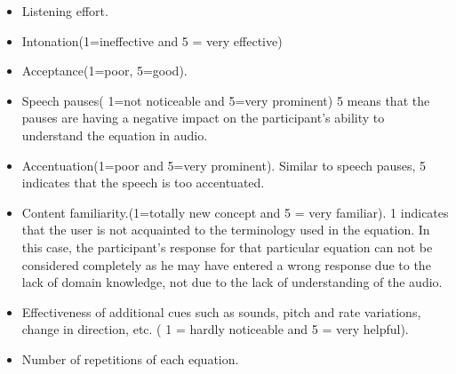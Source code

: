 \documentclass{article}
\begin{document}
\begin{itemize} 

 \item Listening effort.
 \item   Intonation(1=ineffective and 5 = very effective)
 \item   Acceptance(1=poor, 5=good).
 \item   Speech pauses( 1=not noticeable and 5=very prominent)
5 means that the pauses are having a negative impact on the participant’s ability to understand the equation in audio.
 \item   Accentuation(1=poor and 5=very prominent). \cite{hinterleitner2011evaluation}
Similar to speech pauses, 5 indicates that the speech is too accentuated.
 \item   Content familiarity.(1=totally new concept and 5 = very familiar).
1 indicates that the user is not acquainted to the terminology used in the equation. In this case, the participant’s response for that particular equation can not be considered completely as he may have entered a wrong response due to the lack of domain knowledge, not due to the lack of understanding of the audio.
 \item   Effectiveness of additional cues such as sounds, pitch and rate variations, change in direction, etc. ( 1 = hardly noticeable and 5 = very helpful).
 \item   Number of repetitions of each equation.
\end{itemize}
\end{document}
